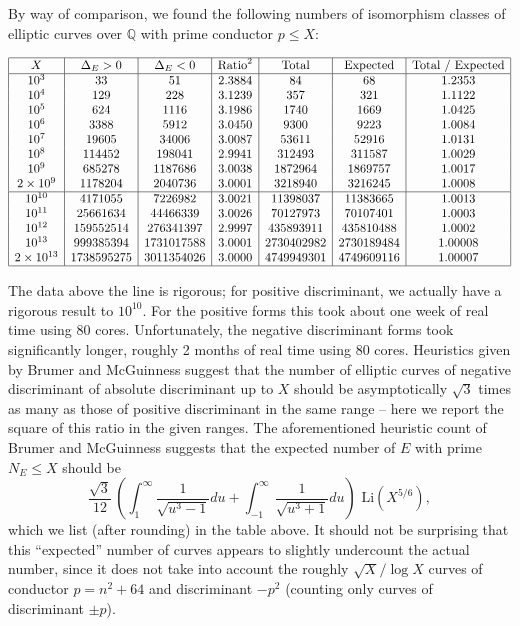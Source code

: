By way of comparison, we found the following numbers of isomorphism classes of
elliptic curves  over $\mathbb{Q}$ with prime conductor $p \leq X$:
\begin{landscape}
 $$
 \begin{array}{|c|c|c|c|c|c|c|} \hline
 X    & \Delta_E > 0  &   \Delta_E < 0 & \mbox{Ratio}^2 &  \mbox{Total}  & \mbox{Expected} & \mbox{Total / Expected} \\ 
\hline
10^3 &  33 &  51 &  2.3884 &  84 &  68 & 1.2353 \\
10^4 &  129 &  228 &  3.1239 &  357 &  321 & 1.1122 \\
10^5 &  624 &  1116 &  3.1986 &  1740 &  1669 & 1.0425 \\
10^6 &  3388 &  5912 &  3.0450 &  9300 &  9223 & 1.0084 \\
10^7 &  19605 &  34006 &  3.0087 &  53611 &  52916 & 1.0131\\
10^8 &  114452 &  198041 &  2.9941 &  312493 &  311587 & 1.0029\\
10^9 &  685278 &  1187686 &  3.0038 &  1872964 &  1869757 & 1.0017 \\
2\times10^9 &  1178204 &  2040736 &  3.0001 &  3218940 &  3216245 & 1.0008\\
\hline
10^{10} &  4171055 &  7226982 &  3.0021 &  11398037 &  11383665 & 1.0013\\
10^{11} &  25661634 &  44466339 &  3.0026 &  70127973 &  70107401 & 1.0003\\
10^{12} &  159552514 &  276341397 &  2.9997 &  435893911 &  435810488 & 1.0002\\
10^{13} &  999385394 &  1731017588 &  3.0001 &  2730402982 &  2730189484 & 1.00008 \\
2\times10^{13} &  1738595275 &  3011354026 &  3.0000 &  4749949301 &  4749609116 & 1.00007 \\
\hline
\end{array}
$$
\end{landscape}

The data above the line is rigorous; for positive discriminant, we actually have a rigorous 
result to $10^{10}$. For the positive forms this took about one week of real time using 80 cores. 
Unfortunately, the negative discriminant forms took significantly longer, roughly 2 months of real time using 80 cores. 
Heuristics given by Brumer and McGuinness \cite{BrMc} suggest that the number of elliptic curves of negative 
discriminant of absolute discriminant up to $X$ should be asymptotically $\sqrt{3}$ times as many as those of positive 
discriminant in the same range -- here we report the square of this ratio in the given ranges. The aforementioned 
heuristic count of Brumer and McGuinness suggests that the 
expected number of $E$ with prime $N_E \leq X$ 
should be 
  $$
  \frac{\sqrt{3}}{12} \, \left( \int_{1}^{\infty} \frac{1}{\sqrt{u^3-1}} du + \int_{-1}^{\infty} \frac{1}{\sqrt{u^3+1}} du  \right) \mbox{ Li} (X^{5/6}),
  $$
  which we list (after rounding) in the table above. It should not be surprising that this ``expected'' number of curves appears to slightly undercount the actual number, since it does not take into account the roughly $\sqrt{X}/\log X$ curves of conductor $p=n^2+64$ and discriminant $-p^2$ (counting only curves of discriminant $\pm p$).

